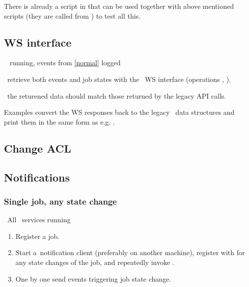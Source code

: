 \begin{hints}
There is already a script  in
 that can be used together with
above mentioned scripts  (they are called from
) to test all this.
\end{hints}



\subsection{WS interface}
\req\  running, events from \ref{normal} logged

\how\ retrieve both events and job states with the \LB\ WS interface
(operations , ).

\result\ the returened data should match those returned by the legacy
API calls.

\begin{hints}
Examples  convert the WS
responses back to the legacy \LB\ data structures and print them in
the same form as e.g. .
\end{hints}


\subsection{Change ACL}

\subsection{Notifications}

\subsubsection{Single job, any state change}
\label{notif1}
\req\ All \LB\ services running

\how
\begin{enumerate}
\item Register a job. 
\item Start a~notification client (preferably on another machine),
register with  for any state changes of the job, 
and repeatedly invoke .
\item One by one send events triggering job state change. 
\end{enumerate}

